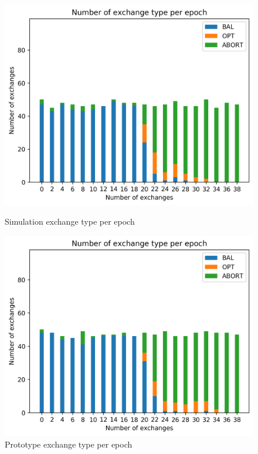 \documentclass[mscthesis]{usiinfthesis}
\begin{document}
\begin{figure}[H]
   \begin{minipage}{0.49\textwidth}
     \centering
     \includegraphics[width=\linewidth]{images/5/5-ex-type.png}
  	\caption{Simulation exchange type per epoch}
  	\label{fig:sim-one-duplicates}
   \end{minipage}\hfill
   \begin{minipage}{0.49\textwidth}
     \centering
     \includegraphics[width=\linewidth]{images/6/6-ex-type}
       \caption{Prototype exchange type per epoch}
 		\label{fig:sim-two-duplicates}
   \end{minipage}
\end{figure}
\end{document}

